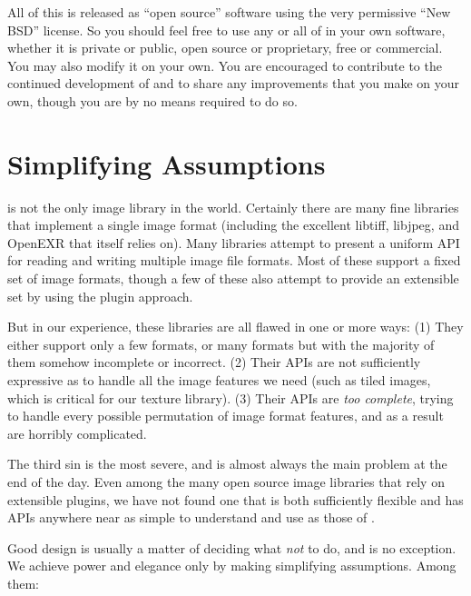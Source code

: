 All of this is released as ``open source'' software using the very
permissive ``New BSD'' license.  So you should feel free to use any or all of
\product in your own software, whether it is private or public, open
source or proprietary, free or commercial.  You may also modify it on
your own.  You are encouraged to contribute to the continued
development of \product and to share any improvements that you make on
your own, though you are by no means required to do so.

\section{Simplifying Assumptions}

\product is not the only image library in the world.  Certainly there
are many fine libraries that implement a single image format (including
the excellent {\fn libtiff}, {\fn libjpeg}, and {\fn OpenEXR} that
\product itself relies on).  Many libraries attempt to present a uniform
API for reading and writing multiple image file formats.  Most of these
support a fixed set of image formats, though a few of these
also attempt to provide an extensible set by using the plugin approach.

But in our experience, these libraries are all flawed in one or more
ways: (1) They either support only a few formats, or many formats but
with the majority of them somehow incomplete or incorrect.  (2) Their
APIs are not sufficiently expressive as to handle all the image features
we need (such as tiled images, which is critical for our texture
library).  (3) Their APIs are \emph{too complete}, trying to handle
every possible permutation of image format features, and as a result
are horribly complicated.

The third sin is the most severe, and is almost always the main problem
at the end of the day.  Even among the many open source image libraries
that rely on extensible plugins, we have not found one that is both
sufficiently flexible and has APIs anywhere near as simple to understand
and use as those of \product.

Good design is usually a matter of deciding what \emph{not} to do, and
\product is no exception.  We achieve power and elegance only by
making simplifying assumptions.  Among them:


